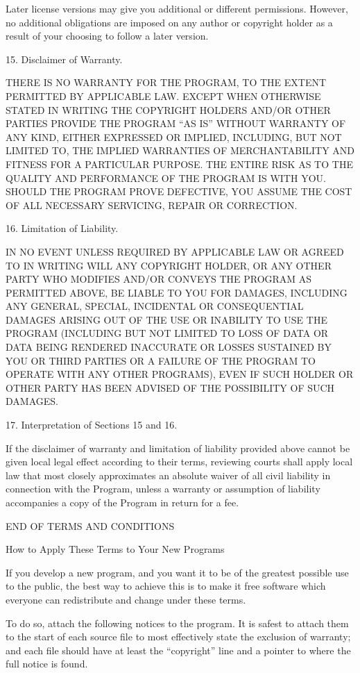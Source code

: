   Later license versions may give you additional or different
permissions.  However, no additional obligations are imposed on any
author or copyright holder as a result of your choosing to follow a
later version.

  15. Disclaimer of Warranty.

  THERE IS NO WARRANTY FOR THE PROGRAM, TO THE EXTENT PERMITTED BY
APPLICABLE LAW.  EXCEPT WHEN OTHERWISE STATED IN WRITING THE COPYRIGHT
HOLDERS AND/OR OTHER PARTIES PROVIDE THE PROGRAM ``AS IS'' WITHOUT WARRANTY
OF ANY KIND, EITHER EXPRESSED OR IMPLIED, INCLUDING, BUT NOT LIMITED TO,
THE IMPLIED WARRANTIES OF MERCHANTABILITY AND FITNESS FOR A PARTICULAR
PURPOSE.  THE ENTIRE RISK AS TO THE QUALITY AND PERFORMANCE OF THE PROGRAM
IS WITH YOU.  SHOULD THE PROGRAM PROVE DEFECTIVE, YOU ASSUME THE COST OF
ALL NECESSARY SERVICING, REPAIR OR CORRECTION.

  16. Limitation of Liability.

  IN NO EVENT UNLESS REQUIRED BY APPLICABLE LAW OR AGREED TO IN WRITING
WILL ANY COPYRIGHT HOLDER, OR ANY OTHER PARTY WHO MODIFIES AND/OR CONVEYS
THE PROGRAM AS PERMITTED ABOVE, BE LIABLE TO YOU FOR DAMAGES, INCLUDING ANY
GENERAL, SPECIAL, INCIDENTAL OR CONSEQUENTIAL DAMAGES ARISING OUT OF THE
USE OR INABILITY TO USE THE PROGRAM (INCLUDING BUT NOT LIMITED TO LOSS OF
DATA OR DATA BEING RENDERED INACCURATE OR LOSSES SUSTAINED BY YOU OR THIRD
PARTIES OR A FAILURE OF THE PROGRAM TO OPERATE WITH ANY OTHER PROGRAMS),
EVEN IF SUCH HOLDER OR OTHER PARTY HAS BEEN ADVISED OF THE POSSIBILITY OF
SUCH DAMAGES.

  17. Interpretation of Sections 15 and 16.

  If the disclaimer of warranty and limitation of liability provided
above cannot be given local legal effect according to their terms,
reviewing courts shall apply local law that most closely approximates
an absolute waiver of all civil liability in connection with the
Program, unless a warranty or assumption of liability accompanies a
copy of the Program in return for a fee.

                     END OF TERMS AND CONDITIONS

            How to Apply These Terms to Your New Programs

  If you develop a new program, and you want it to be of the greatest
possible use to the public, the best way to achieve this is to make it
free software which everyone can redistribute and change under these terms.

  To do so, attach the following notices to the program.  It is safest
to attach them to the start of each source file to most effectively
state the exclusion of warranty; and each file should have at least
the ``copyright'' line and a pointer to where the full notice is found.

